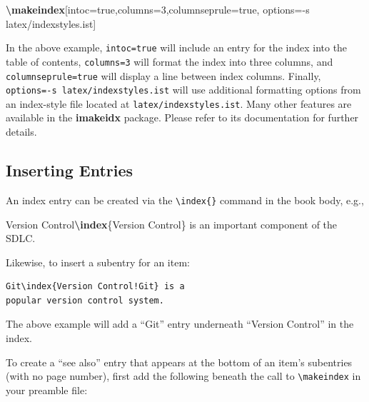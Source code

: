 \documentclass[
  12pt,
]{krantz}
\newenvironment{Shaded}{\begin{snugshade}}{\end{snugshade}}
\newcommand{\FunctionTok}[1]{\textcolor[rgb]{0.13,0.29,0.53}{\textbf{#1}}}
\newcommand{\NormalTok}[1]{#1}
\theoremstyle{definition}
\theoremstyle{definition}
\theoremstyle{definition}
\theoremstyle{definition}
\theoremstyle{remark}
\begin{document}
\begin{Shaded}
\begin{Highlighting}[]
\FunctionTok{\textbackslash{}makeindex}\NormalTok{[intoc=true,columns=3,columnseprule=true,}
\NormalTok{           options={-}s latex/indexstyles.ist]}
\end{Highlighting}
\end{Shaded}

In the above example, \texttt{intoc=true} will include an entry for the index into the table of contents, \texttt{columns=3} will format the index into three columns, and \texttt{columnseprule=true} will display a line between index columns. Finally, \texttt{options=-s\ latex/indexstyles.ist} will use additional formatting options from an index-style file located at \texttt{latex/indexstyles.ist}. Many other features are available in the \textbf{imakeidx} package. Please refer to its documentation for further details.

\subsection{Inserting Entries}\label{inserting-entries}

An index entry can be created via the \texttt{\textbackslash{}index\{\}} command in the book body, e.g.,

\begin{Shaded}
\begin{Highlighting}[]
\NormalTok{Version Control}\FunctionTok{\textbackslash{}index}\NormalTok{\{Version Control\} is an}
\NormalTok{important component of the SDLC.}
\end{Highlighting}
\end{Shaded}

Likewise, to insert a subentry for an item:

\begin{verbatim}
Git\index{Version Control!Git} is a
popular version control system.
\end{verbatim}

The above example will add a ``Git'' entry underneath ``Version Control'' in the index.

To create a ``see also'' entry that appears at the bottom of an item's subentries (with no page number), first add the following beneath the call to \texttt{\textbackslash{}makeindex} in your preamble file:
\end{document}
